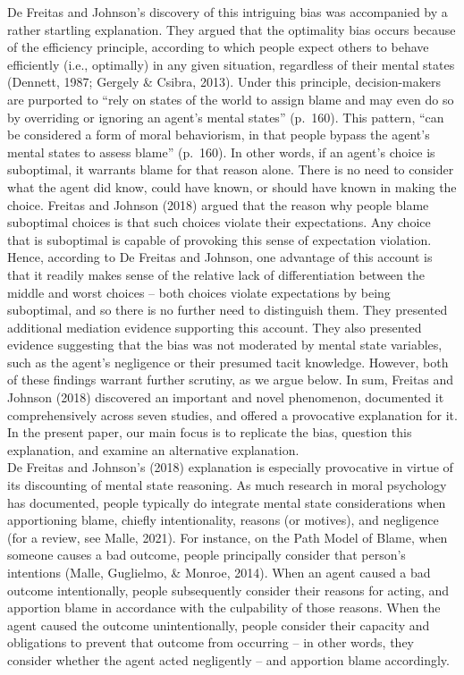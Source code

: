 \documentclass[
  man, donotrepeattitle,floatsintext]{apa6}
\begin{document}
De Freitas and Johnson's discovery of this intriguing bias was accompanied by a rather startling explanation. They argued that the optimality bias occurs because of the efficiency principle, according to which people expect others to behave efficiently (i.e., optimally) in any given situation, regardless of their mental states (Dennett, 1987; Gergely \& Csibra, 2013). Under this principle, decision-makers are purported to ``rely on states of the world to assign blame and may even do so by overriding or ignoring an agent's mental states'' (p.~160). This pattern, ``can be considered a form of moral behaviorism, in that people bypass the agent's mental states to assess blame'' (p.~160). In other words, if an agent's choice is suboptimal, it warrants blame for that reason alone. There is no need to consider what the agent did know, could have known, or should have known in making the choice. Freitas and Johnson (2018) argued that the reason why people blame suboptimal choices is that such choices violate their expectations. Any choice that is suboptimal is capable of provoking this sense of expectation violation. Hence, according to De Freitas and Johnson, one advantage of this account is that it readily makes sense of the relative lack of differentiation between the middle and worst choices -- both choices violate expectations by being suboptimal, and so there is no further need to distinguish them. They presented additional mediation evidence supporting this account. They also presented evidence suggesting that the bias was not moderated by mental state variables, such as the agent's negligence or their presumed tacit knowledge. However, both of these findings warrant further scrutiny, as we argue below. In sum, Freitas and Johnson (2018) discovered an important and novel phenomenon, documented it comprehensively across seven studies, and offered a provocative explanation for it. In the present paper, our main focus is to replicate the bias, question this explanation, and examine an alternative explanation.\\
De Freitas and Johnson's (2018) explanation is especially provocative in virtue of its discounting of mental state reasoning. As much research in moral psychology has documented, people typically do integrate mental state considerations when apportioning blame, chiefly intentionality, reasons (or motives), and negligence (for a review, see Malle, 2021). For instance, on the Path Model of Blame, when someone causes a bad outcome, people principally consider that person's intentions (Malle, Guglielmo, \& Monroe, 2014). When an agent caused a bad outcome intentionally, people subsequently consider their reasons for acting, and apportion blame in accordance with the culpability of those reasons. When the agent caused the outcome unintentionally, people consider their capacity and obligations to prevent that outcome from occurring -- in other words, they consider whether the agent acted negligently -- and apportion blame accordingly.\\
\end{document}
